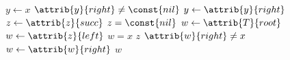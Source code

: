 \begin{codebox}
\li $y \gets x$
\li \While $\attrib{y}{right} \neq \const{nil}$
\li \Do 
        $y \gets \attrib{y}{right}$
    \End
\li $z \gets \attrib{z}{succ}$
\li \If $z = \const{nil}$
\li \Then
        $w \gets \attrib{T}{root}$
\li \Else
\li     $w \gets \attrib{z}{left}$
    \End
\li \If $w = x$
\li \Then
        \Return $z$
    \End
\li \While $\attrib{w}{right} \neq x$
\li \Do
        $w \gets \attrib{w}{right}$
    \End
\li \Return $w$
\end{codebox}